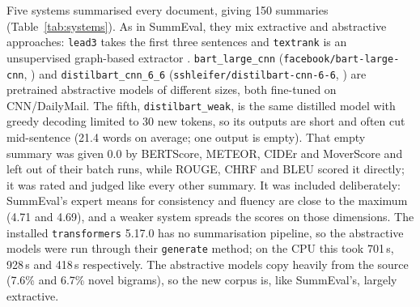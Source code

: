 \documentclass[11pt]{article}
\begin{document}
Five systems summarised every document, giving 150 summaries (Table~\ref{tab:systems}). As in SummEval, they mix extractive and abstractive approaches: \texttt{lead3} takes the first three sentences and \texttt{textrank} is an unsupervised graph-based extractor \citep{mihalcea-tarau-2004-textrank}. \texttt{bart\_large\_cnn} (\texttt{facebook/bart-large-cnn}, \citealp{lewis-etal-2020-bart}) and \texttt{distilbart\_cnn\_6\_6} (\texttt{sshleifer/distilbart-cnn-6-6}, \citealp{shleifer-rush-2020-distillation}) are pretrained abstractive models of different sizes, both fine-tuned on CNN/DailyMail. The fifth, \texttt{distilbart\_weak}, is the same distilled model with greedy decoding limited to 30 new tokens, so its outputs are short and often cut mid-sentence (21.4 words on average; one output is empty). That empty summary was given 0.0 by BERTScore, METEOR, CIDEr and MoverScore and left out of their batch runs, while ROUGE, CHRF and BLEU scored it directly; it was rated and judged like every other summary. It was included deliberately: SummEval's expert means for consistency and fluency are close to the maximum (4.71 and 4.69), and a weaker system spreads the scores on those dimensions. The installed \texttt{transformers} 5.17.0 has no summarisation pipeline, so the abstractive models were run through their \texttt{generate} method; on the CPU this took 701\,s, 928\,s and 418\,s respectively. The abstractive models copy heavily from the source (7.6\% and 6.7\% novel bigrams), so the new corpus is, like SummEval's, largely extractive.
\end{document}
